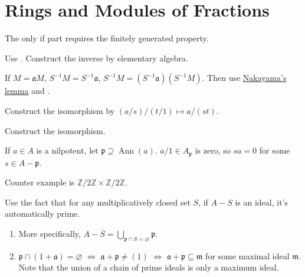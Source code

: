 \section{Rings and Modules of Fractions}

\begin{exercise}\label{ex3.1}
	The only if part requires the finitely generated property.
\end{exercise}

\begin{exercise}\label{ex3.2}
	Use . Construct the inverse by elementary algebra.
	
	If $M=\mathfrak{a}M$, $S^{-1}M=S^{-1}\mathfrak{a}$, $S^{-1}M=\left(S^{-1}\mathfrak{a}\right)\left(S^{-1}M\right)$. Then use \hyperref[2.6]{Nakayama's lemma} and .
\end{exercise}

\begin{exercise}\label{ex3.3}
	Construct the isomorphism by $(a/s)/(t/1)\mapsto a/(st)$.
\end{exercise}

\begin{exercise}\label{ex3.4}
	Construct the isomorphism.
\end{exercise}

\begin{exercise}\label{ex3.5}
	If $a\in A$ is a nilpotent, let $\mathfrak{p}\supseteq\operatorname{Ann}(a)$. $a/1\in A_\mathfrak{p}$ is zero, so $sa=0$ for some $s\in A-\mathfrak{p}$.
	
	Counter example is $\mathbb{Z}/2\mathbb{Z}\times\mathbb{Z}/2\mathbb{Z}$.
\end{exercise}

\begin{exercise}\label{ex3.6}
	Use the fact that for any multiplicatively closed set $S$, if $A-S$ is an ideal, it's automatically prime.
\end{exercise}

\begin{exercise}\label{ex3.7}
	\begin{enumerate}
		\item[(i),(ii)]More specifically, $A-\overline{S}=\bigcup_{\mathfrak{p}\cap S=\varnothing}\mathfrak{p}$.
		\item[(iii)]$\mathfrak{p}\cap(1+\mathfrak{a})=\varnothing$ $\Leftrightarrow$ $\mathfrak{a}+\mathfrak{p}\neq(1)$ $\Leftrightarrow$ $\mathfrak{a}+\mathfrak{p}\subseteq\mathfrak{m}$ for some maximal ideal $\mathfrak{m}$. Note that the union of a chain of prime ideals is only a maximum ideal.
	\end{enumerate}
\end{exercise}

